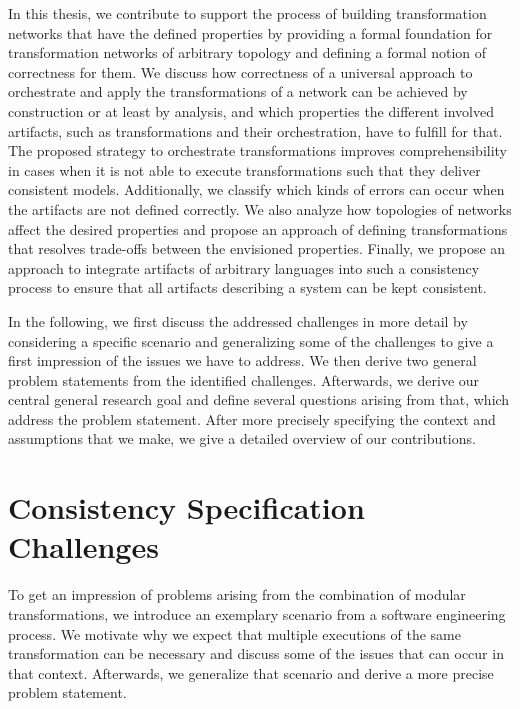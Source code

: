 In this thesis, we contribute to support the process of building transformation networks that have the defined properties by providing a formal foundation for transformation networks of arbitrary topology and defining a formal notion of correctness for them.
We discuss how correctness of a universal approach to orchestrate and apply the transformations of a network can be achieved by construction or at least by analysis, and which properties the different involved artifacts, such as transformations and their orchestration, have to fulfill for that.
The proposed strategy to orchestrate transformations improves comprehensibility in cases when it is not able to execute transformations such that they deliver consistent models.
Additionally, we classify which kinds of errors can occur when the artifacts are not defined correctly.
We also analyze how topologies of networks affect the desired properties and propose an approach of defining transformations that resolves trade-offs between the envisioned properties.
Finally, we propose an approach to integrate artifacts of arbitrary languages into such a consistency process to ensure that all artifacts describing a system can be kept consistent.

In the following, we first discuss the addressed challenges in more detail by considering a specific scenario and generalizing some of the challenges to give a first impression of the issues we have to address.
We then derive two general problem statements from the identified challenges.
Afterwards, we derive our central general research goal and define several questions arising from that, which address the problem statement.
After more precisely specifying the context and assumptions that we make, we give a detailed overview of our contributions.



\section{Consistency Specification Challenges}

To get an impression of problems arising from the combination of modular transformations, we introduce an exemplary scenario from a software engineering process.
We motivate why we expect that multiple executions of the same transformation can be necessary and discuss some of the issues that can occur in that context.
Afterwards, we generalize that scenario and derive a more precise problem statement.

